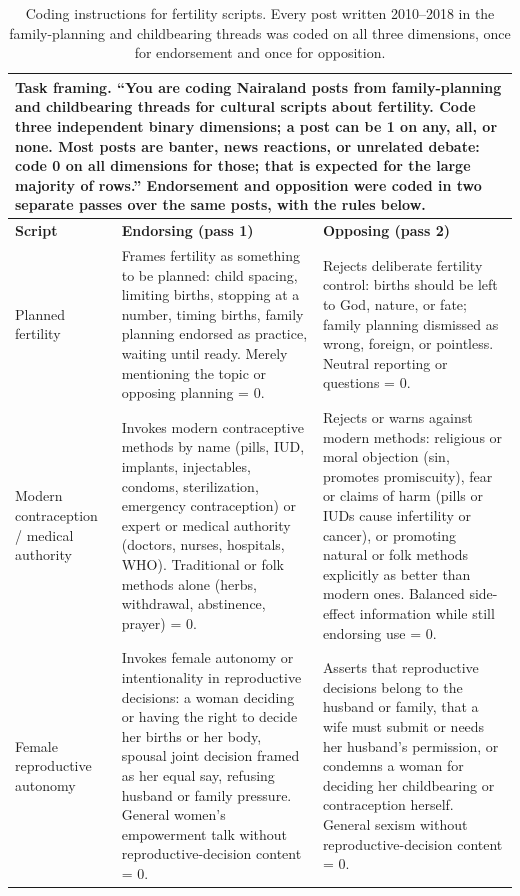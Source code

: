 \begin{table}[t]
\centering
\footnotesize
\begin{tabular}{p{2.6cm}p{5.6cm}p{5.6cm}}
\toprule
\multicolumn{3}{p{13.8cm}}{\textbf{Task framing.} ``You are coding Nairaland
posts from family-planning and childbearing threads for cultural scripts
about fertility. Code three independent binary dimensions; a post can be 1 on
any, all, or none. Most posts are banter, news reactions, or unrelated
debate: code 0 on all dimensions for those; that is expected for the large
majority of rows.'' Endorsement and opposition were coded in two separate
passes over the same posts, with the rules below.} \\
\midrule
\textbf{Script} & \textbf{Endorsing (pass 1)} & \textbf{Opposing (pass 2)} \\
\midrule
Planned fertility & Frames fertility as something to be planned: child
spacing, limiting births, stopping at a number, timing births, family
planning endorsed as practice, waiting until ready. Merely mentioning the
topic or opposing planning = 0. & Rejects deliberate fertility control:
births should be left to God, nature, or fate; family planning dismissed as
wrong, foreign, or pointless. Neutral reporting or questions = 0. \\
\addlinespace
Modern contraception / medical authority & Invokes modern contraceptive
methods by name (pills, IUD, implants, injectables, condoms, sterilization,
emergency contraception) or expert or medical authority (doctors, nurses,
hospitals, WHO). Traditional or folk methods alone (herbs, withdrawal,
abstinence, prayer) = 0. & Rejects or warns against modern methods:
religious or moral objection (sin, promotes promiscuity), fear or claims of
harm (pills or IUDs cause infertility or cancer), or promoting natural or
folk methods explicitly as better than modern ones. Balanced side-effect
information while still endorsing use = 0. \\
\addlinespace
Female reproductive autonomy & Invokes female autonomy or intentionality in
reproductive decisions: a woman deciding or having the right to decide her
births or her body, spousal joint decision framed as her equal say, refusing
husband or family pressure. General women's empowerment talk without
reproductive-decision content = 0. & Asserts that reproductive decisions
belong to the husband or family, that a wife must submit or needs her
husband's permission, or condemns a woman for deciding her childbearing or
contraception herself. General sexism without reproductive-decision
content = 0. \\
\bottomrule
\end{tabular}
\caption{Coding instructions for fertility scripts. Every post written
2010--2018 in the family-planning and childbearing threads was coded on all
three dimensions, once for endorsement and once for opposition.}
\label{tab:codebook_scripts}
\end{table}
